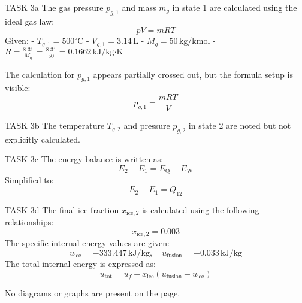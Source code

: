 TASK 3a  
The gas pressure \( p_{g,1} \) and mass \( m_g \) in state 1 are calculated using the ideal gas law:  
\[
pV = mRT
\]  
Given:  
- \( T_{g,1} = 500^\circ\text{C} \)  
- \( V_{g,1} = 3.14 \, \text{L} \)  
- \( M_g = 50 \, \text{kg/kmol} \)  
- \( R = \frac{8.31}{M_g} = \frac{8.31}{50} = 0.1662 \, \text{kJ/kg·K} \)  

The calculation for \( p_{g,1} \) appears partially crossed out, but the formula setup is visible:  
\[
p_{g,1} = \frac{mRT}{V}
\]  

TASK 3b  
The temperature \( T_{g,2} \) and pressure \( p_{g,2} \) in state 2 are noted but not explicitly calculated.  

TASK 3c  
The energy balance is written as:  
\[
E_2 - E_1 = E_{\text{Q}} - E_{\text{W}}
\]  
Simplified to:  
\[
E_2 - E_1 = Q_{12}
\]  

TASK 3d  
The final ice fraction \( x_{\text{ice},2} \) is calculated using the following relationships:  
\[
x_{\text{ice},2} = 0.003
\]  
The specific internal energy values are given:  
\[
u_{\text{ice}} = -333.447 \, \text{kJ/kg}, \quad u_{\text{fusion}} = -0.033 \, \text{kJ/kg}
\]  
The total internal energy is expressed as:  
\[
u_{\text{tot}} = u_f + x_{\text{ice}} \left( u_{\text{fusion}} - u_{\text{ice}} \right)
\]  

No diagrams or graphs are present on the page.